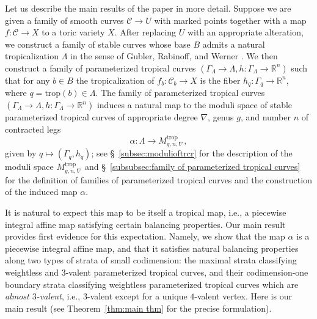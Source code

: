 \documentclass[11pt,reqno]{amsart}
\numberwithin{equation}{section}
\theoremstyle{definition}
\newcommand{\trop}{\mathrm{trop}}
\newcommand{\RR}{{\mathbb R}}
\def\:{\colon}
\newcommand{\cC}{{\mathcal{C}}}
\theoremstyle{remark}
\begin{document}
Let us describe the main results of the paper in more detail. Suppose we are given a family of smooth curves $\cC \to U$ with marked points together with a map $f\:\cC \to X$ to a toric variety $X$. After replacing $U$ with an appropriate alteration, we construct a family of stable curves whose base $B$ admits a natural tropicalization $\Lambda$ in the sense of Gubler, Rabinoff, and Werner \cite{GRW16}. We then construct a family of parameterized tropical curves $\left(\Gamma_\Lambda \to \Lambda, h\:\Gamma_\Lambda \to \RR^n\right)$ such that for any $b\in B$ the tropicalization of $f_b\:\cC_b\to X$ is the fiber $h_q\:\Gamma_q\to\RR^n$, where $q=\trop(b)\in\Lambda$. 
The family of parameterized tropical curves $\left(\Gamma_\Lambda \to \Lambda, h\:\Gamma_\Lambda \to \RR^n\right)$ induces a natural map to the moduli space of stable parameterized tropical curves of appropriate degree $\nabla$, genus $g$, and number $n$ of contracted legs \[\alpha \colon \Lambda \to M_{g,n,\nabla}^\trop,\] 
given by $q\mapsto (\Gamma_q,h_q)$; see \S~\ref{subsec:modulioftrcr} for the description  of the moduli space $M_{g,n,\nabla}^\trop$ and \S~\ref{subsubsec:family of parameterized tropical curves} for the definition of families of parameterized tropical curves and the construction of the induced map $\alpha$. 

It is natural to expect this map to be itself a tropical map, i.e., a piecewise integral affine map satisfying certain balancing properties. Our main result provides first evidence for this expectation. Namely, we show that the map $\alpha$ is a piecewise integral affine map, and that it satisfies natural balancing properties along two types of strata of small codimension: the maximal strata classifying weightless and $3$-valent parameterized tropical curves, and their codimension-one boundary strata classifying weightless parameterized tropical curves which are {\em almost $3$-valent}, i.e., $3$-valent except for a unique $4$-valent vertex. Here is our main result (see Theorem~\ref{thm:main thm} for the precise formulation).
\end{document}
